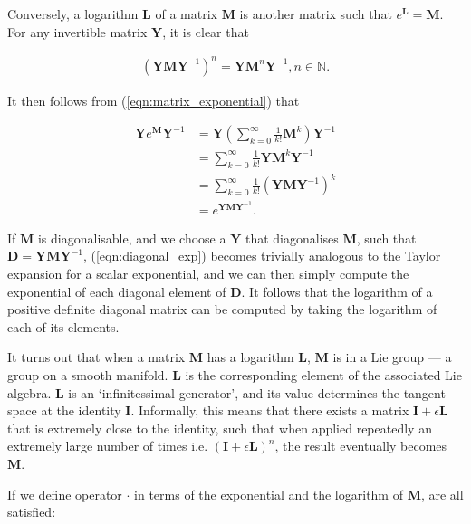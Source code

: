         Conversely, a logarithm $\mathbf{L}$ of a matrix $\mathbf{M}$ is another matrix such that $e^\mathbf{L} = \mathbf{M}$. For any invertible matrix $\mathbf{Y}$, it is clear that
        
        \begin{gather}
          (\mathbf{YM}\mathbf{Y}^{-1})^n = \mathbf{Y}\mathbf{M}^n\mathbf{Y}^{-1}, n \in \mathbb{N}.
        \end{gather}
        
        It then follows from (\ref{eqn:matrix_exponential}) that
        
        \begin{align}
          \mathbf{Y}e^{\mathbf{M}}\mathbf{Y}^{-1} &= \mathbf{Y}\left(\sum_{k=0}^{\infty}\frac{1}{k!}\mathbf{M}^k\right)\mathbf{Y}^{-1} \\
                                                  &= \sum_{k=0}^{\infty}\frac{1}{k!}\mathbf{Y}\mathbf{M}^k\mathbf{Y}^{-1} \\
                                                  &= \sum_{k=0}^{\infty}\frac{1}{k!}(\mathbf{YM}\mathbf{Y}^{-1})^k \label{eqn:diagonal_exp} \\
                                                  &= e^{\mathbf{YM}\mathbf{Y}^{-1}}.
        \end{align}
        
        If $\mathbf{M}$ is diagonalisable, and we choose a $\mathbf{Y}$ that diagonalises $\mathbf{M}$, such that $\mathbf{D} = \mathbf{YMY}^{-1}$, (\ref{eqn:diagonal_exp}) becomes trivially analogous to the Taylor expansion for a scalar exponential, and we can then simply compute the exponential of each diagonal element of $\mathbf{D}$. It follows that the logarithm of a positive definite diagonal matrix can be computed by taking the logarithm of each of its elements.
        
        It turns out that when a matrix $\mathbf{M}$ has a logarithm $\mathbf{L}$, $\mathbf{M}$ is in a Lie group --- a group on a smooth manifold. $\mathbf{L}$ is the corresponding element of the associated Lie algebra. $\mathbf{L}$ is an `infinitessimal generator', and its value determines the tangent space at the identity $\mathbf{I}$. Informally, this means that there exists a matrix $\mathbf{I} + \epsilon \mathbf{L}$ that is extremely close to the identity, such that when applied repeatedly an extremely large number of times i.e. $(\mathbf{I} + \epsilon \mathbf{L})^n$, the result eventually becomes $\mathbf{M}$.
        
        If we define operator $\cdot$ in terms of the exponential and the logarithm of $\mathbf{M}$,  are all satisfied:
        
